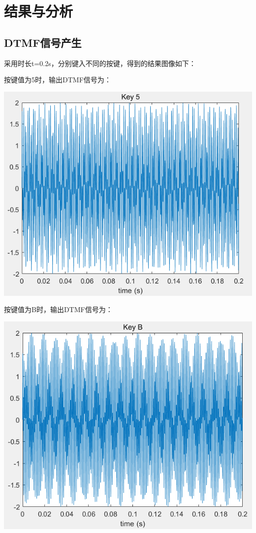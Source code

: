 \documentclass[10pt, a4paper]{article}
\begin{document}
\section{结果与分析}

\subsection{DTMF信号产生}
采用时长t=0.2s，分别键入不同的按键，得到的结果图像如下：

按键值为5时，输出DTMF信号为：

\centerline{\includegraphics[scale=0.8]{assets/8.png}}

按键值为B时，输出DTMF信号为：

\centerline{\includegraphics[scale=0.8]{assets/9.png}}
\end{document}
